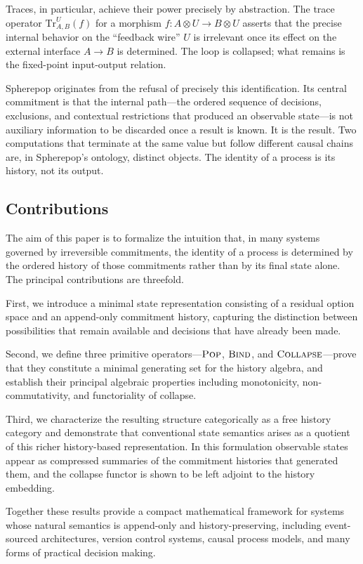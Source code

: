 \documentclass[12pt]{article}
\newcommand{\Pop}{\operatorname{\textsc{Pop}}}
\newcommand{\Bind}{\operatorname{\textsc{Bind}}}
\newcommand{\Collapse}{\operatorname{\textsc{Collapse}}}
\begin{document}
Traces, in particular, achieve their power precisely by abstraction. The trace operator $\mathrm{Tr}^U_{A,B}(f)$ for a morphism $f : A \otimes U \to B \otimes U$ asserts that the precise internal behavior on the ``feedback wire'' $U$ is irrelevant once its effect on the external interface $A \to B$ is determined. The loop is collapsed; what remains is the fixed-point input-output relation.

Spherepop originates from the refusal of precisely this identification. Its central commitment is that the internal path---the ordered sequence of decisions, exclusions, and contextual restrictions that produced an observable state---is not auxiliary information to be discarded once a result is known. It is the result. Two computations that terminate at the same value but follow different causal chains are, in Spherepop's ontology, distinct objects. The identity of a process is its history, not its output.

\subsection{Contributions}

The aim of this paper is to formalize the intuition that, in many
systems governed by irreversible commitments, the identity of a
process is determined by the ordered history of those commitments
rather than by its final state alone. The principal contributions
are threefold.

First, we introduce a minimal state representation consisting of a residual option space and an append-only commitment history, capturing the distinction between possibilities that remain available and decisions that have already been made.

Second, we define three primitive operators---$\Pop$, $\Bind$, and $\Collapse$---prove that they constitute a minimal generating set for the history algebra, and establish their principal algebraic properties including monotonicity, non-commutativity, and functoriality of collapse.

Third, we characterize the resulting structure categorically as a free history category and demonstrate that conventional state semantics arises as a quotient of this richer history-based representation. In this formulation observable states appear as compressed summaries of the commitment histories that generated them, and the collapse functor is shown to be left adjoint to the history embedding.

Together these results provide a compact mathematical framework for systems whose natural semantics is append-only and history-preserving, including event-sourced architectures, version control systems, causal process models, and many forms of practical decision making.
\end{document}
